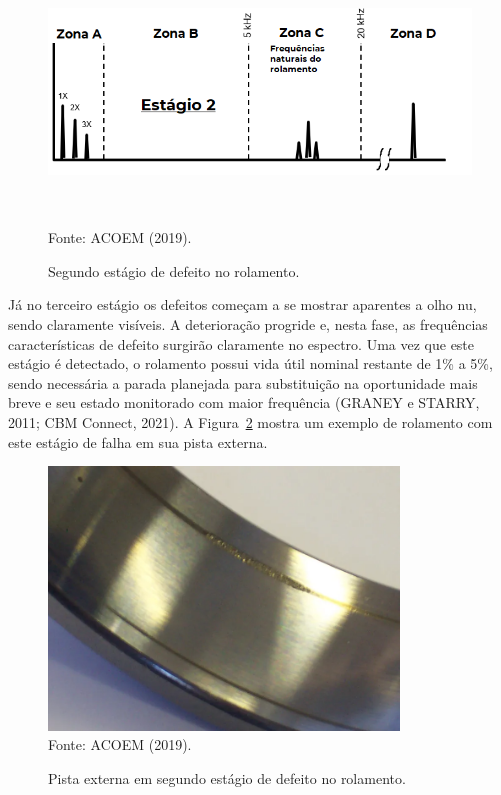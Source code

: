\documentclass[
	12pt,				
	oneside,			
	a4paper,			
	english,			
	brazil,	
	sumario=abnt-6027-2012		
	]{abntex2ppgsi}
\begin{document}
\begin{figure}[H]
\centering
\caption {Segundo estágio de defeito no rolamento.}
\includegraphics[width=\textwidth,height=70mm,keepaspectratio]{estagio_2} \\
Fonte: ACOEM (2019).
\label{estagio_2}
\end{figure}

Já no terceiro estágio os defeitos começam a se mostrar aparentes a olho nu, sendo claramente visíveis. A deterioração progride e, nesta fase, as frequências características de defeito surgirão claramente no espectro. Uma vez que este estágio é detectado, o rolamento possui vida útil nominal restante de 1\% a 5\%, sendo necessária a parada planejada para substituição na oportunidade mais breve e seu estado monitorado com maior frequência (GRANEY e STARRY, 2011; CBM Connect, 2021). A Figura~\ref{estagio_tres_pista_externa} mostra um exemplo de rolamento com este estágio de falha em sua pista externa.

\begin{figure}[H]
\centering
\caption {Pista externa em segundo estágio de defeito no rolamento.}
\includegraphics[width=\textwidth,height=70mm,keepaspectratio]{estagio_tres_pista_externa} \\
Fonte: ACOEM (2019).
\label{estagio_tres_pista_externa}
\end{figure}
\end{document}
